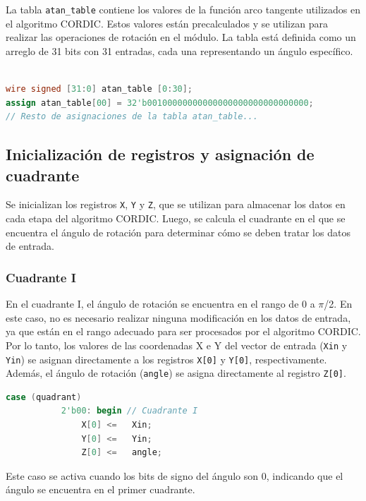 \documentclass[12pt,a4paper, twoside]{article} %
\begin{document}
La tabla \texttt{atan\_table} contiene los valores de la función arco tangente utilizados en el algoritmo CORDIC. Estos valores están precalculados y se utilizan para realizar las operaciones de rotación en el módulo. La tabla está definida como un arreglo de 31 bits con 31 entradas, cada una representando un ángulo específico.

\begin{lstlisting}[language=Verilog]

wire signed [31:0] atan_table [0:30];
assign atan_table[00] = 32'b00100000000000000000000000000000; 
// Resto de asignaciones de la tabla atan_table...

\end{lstlisting}

\subsection{Inicialización de registros y asignación de cuadrante}

Se inicializan los registros \texttt{X}, \texttt{Y} y \texttt{Z}, que se utilizan para almacenar los datos en cada etapa del algoritmo CORDIC. Luego, se calcula el cuadrante en el que se encuentra el ángulo de rotación para determinar cómo se deben tratar los datos de entrada.

\subsubsection{Cuadrante I}

En el cuadrante I, el ángulo de rotación se encuentra en el rango de 0 a $\pi$/2. En este caso, no es necesario realizar ninguna modificación en los datos de entrada, ya que están en el rango adecuado para ser procesados por el algoritmo CORDIC. Por lo tanto, los valores de las coordenadas X e Y del vector de entrada (\texttt{Xin} y \texttt{Yin}) se asignan directamente a los registros \texttt{X[0]} y \texttt{Y[0]}, respectivamente. Además, el ángulo de rotación (\texttt{angle}) se asigna directamente al registro \texttt{Z[0]}.

\begin{lstlisting}[language=Verilog]
       case (quadrant)
           2'b00: begin // Cuadrante I
               X[0] <=   Xin;
               Y[0] <=   Yin;
               Z[0] <=   angle;
\end{lstlisting}

Este caso se activa cuando los bits de signo del ángulo son 0, indicando que el ángulo se encuentra en el primer cuadrante.
\end{document}
